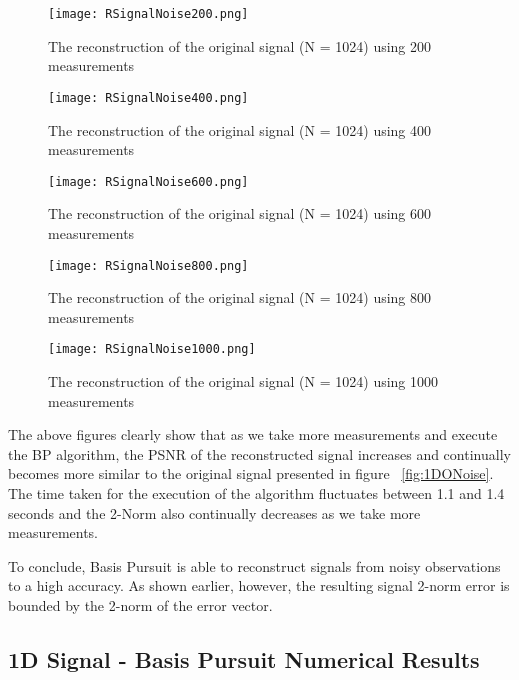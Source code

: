 \documentclass[titlepage,oneside, 12pt]{book}
\theoremstyle{break}
\begin{document}
\begin{figure}[H]
\centering
\centerline{\texttt{[image: RSignalNoise200.png]}}
\caption{The reconstruction of the original signal (N = 1024) using 200 measurements}
\label{fig:1DRNoise200}
\end{figure}

\begin{figure}[H]
\centering
\centerline{\texttt{[image: RSignalNoise400.png]}}
\caption{The reconstruction of the original signal (N = 1024) using 400 measurements}
\label{fig:1DRNoise400}
\end{figure}

\begin{figure}[H]
\centering
\centerline{\texttt{[image: RSignalNoise600.png]}}
\caption{The reconstruction of the original signal (N = 1024) using 600 measurements}
\label{fig:1DRNoise600}
\end{figure}

\begin{figure}[H]
\centering
\centerline{\texttt{[image: RSignalNoise800.png]}}
\caption{The reconstruction of the original signal (N = 1024) using 800 measurements}
\label{fig:1DRNoise800}
\end{figure}

\begin{figure}[H]
\centering
\centerline{\texttt{[image: RSignalNoise1000.png]}}
\caption{The reconstruction of the original signal (N = 1024) using 1000 measurements}
\label{fig:1DRNoise1000}
\end{figure}

The above figures clearly show that as we take more measurements and execute the BP algorithm, the PSNR of the reconstructed signal increases and continually becomes more similar to the original signal presented in figure ~\ref{fig:1DONoise}. The time taken for the execution of the algorithm  fluctuates between 1.1 and 1.4 seconds and the 2-Norm also continually decreases as we take more measurements. 

To conclude, Basis Pursuit is able to reconstruct signals from noisy observations to a high accuracy. As shown earlier, however, the resulting signal 2-norm error is bounded by the 2-norm of the error vector. 


\newpage
\subsection{1D Signal - Basis Pursuit Numerical Results}
\end{document}
